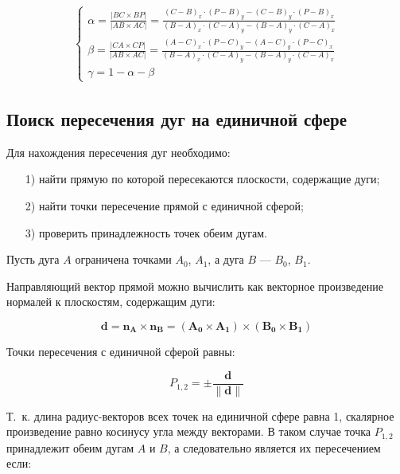 \begin{equation}
    \begin{aligned}
        \begin{cases}
            \alpha = \frac{|BC \times BP|}{|AB \times AC|} = \frac{(C - B)_x \cdot (P - B)_y - (C - B)_y \cdot (P - B)_x}{(B - A)_x \cdot (C - A)_y - (B - A)_y \cdot (C - A)_x} \\
            \beta = \frac{|CA \times CP|}{|AB \times AC|} = \frac{(A - C)_x \cdot (P - C)_y - (A - C)_y \cdot (P - C)_x}{(B - A)_x \cdot (C - A)_y - (B - A)_y \cdot (C - A)_x} \\
            \gamma = 1 - \alpha - \beta
        \end{cases}
    \end{aligned}
\end{equation}

\subsection{Поиск пересечения дуг на единичной сфере}

Для нахождения пересечения дуг необходимо:
\begin{enumerate}
    \item[1)] найти прямую по которой пересекаются плоскости, содержащие дуги;
    \item[2)] найти точки пересечение прямой с единичной сферой;
    \item[3)] проверить принадлежность точек обеим дугам.
\end{enumerate}

Пусть дуга $A$ ограничена точками $A_0$, $A_1$, а дуга $B$ --- $B_0$, $B_1$.

Направляющий вектор прямой можно вычислить как векторное произведение нормалей к плоскостям, содержащим дуги:

\begin{equation}
    \mathbf{d} = \mathbf{n_A} \times \mathbf{n_B} = (\mathbf{A_0} \times  \mathbf{A_1}) \times (\mathbf{B_0} \times  \mathbf{B_1})
\end{equation}

Точки пересечения с единичной сферой равны:

\begin{equation}
    P_{1,2} = \pm \frac{\mathbf{d}}{\parallel\mathbf{d}\parallel}
\end{equation}

Т.~к. длина радиус-векторов всех точек на единичной сфере равна 1, скалярное произведение равно косинусу угла между векторами. В таком случае точка $P_{1,2}$ принадлежит обеим дугам $A$ и $B$, а следовательно является их пересечением если:

